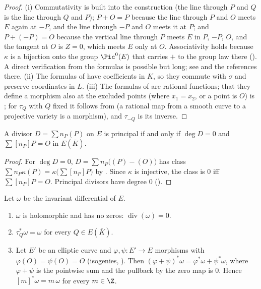 \begin{proof}
(i) Commutativity is built into the construction (the line through $P$ and $Q$ is the line through $Q$ and $P$); $P+O=P$ because the line
through $P$ and $O$ meets $E$ again at $-P$, and the line through $-P$ and $O$ meets it at $P$; and $P+(-P)=O$ because the vertical line through
$P$ meets $E$ in $P$, $-P$, $O$, and the tangent at $O$ is $Z=0$, which meets $E$ only at $O$. Associativity holds because $\kappa$ is a bijection onto
the group $\Pic^0(E)$ that carries $+$ to the group law there (). A direct verification from the formulas is possible but
long; see \cite[Section III.2]{SilvermanAEC} and the references there. (ii) The formulas of  have coefficients in $K$, so
they commute with $\sigma$ and preserve coordinates in $L$. (iii) The formulas of  are rational functions; that they
define a morphism also at the excluded points (where $x_1=x_2$, or a point is $O$) is \cite[Section III.3]{SilvermanAEC}; for $\tau_Q$ with $Q$ fixed it
follows from  (a rational map from a smooth curve to a projective variety is a morphism), and $\tau_{-Q}$ is its inverse.
\end{proof}

\begin{corollary}\label{cor:ellcurves:principal}
A divisor $D=\sum n_P(P)$ on $E$ is principal if and only if $\deg D=0$ and $\sum[n_P]P=O$ in $E(\bar K)$.
\end{corollary}

\begin{proof}
For $\deg D=0$, $D=\sum n_P\bigl((P)-(O)\bigr)$ has class $\sum n_P\kappa(P)=\kappa\bigl(\sum[n_P]P\bigr)$ by . Since $\kappa$ is
injective, the class is $0$ iff $\sum[n_P]P=O$. Principal divisors have degree $0$ ().
\end{proof}

\begin{proposition}\label{prop:ellcurves:invdiff}
Let $\omega$ be the invariant differential of $E$.
\begin{enumerate}[label=(\roman*)]
\item $\omega$ is holomorphic and has no zeros: $\operatorname{div}(\omega)=0$.
\item $\tau_Q^*\omega=\omega$ for every $Q\in E(\bar K)$.
\item Let $E'$ be an elliptic curve and $\varphi,\psi\colon E'\to E$ morphisms with $\varphi(O)=\psi(O)=O$ (isogenies, ). Then
$(\varphi+\psi)^*\omega=\varphi^*\omega+\psi^*\omega$, where $\varphi+\psi$ is the pointwise sum and the pullback by the zero map is $0$. Hence $[m]^*\omega=m\,\omega$ for every $m\in\Z$.
\end{enumerate}
\end{proposition}


